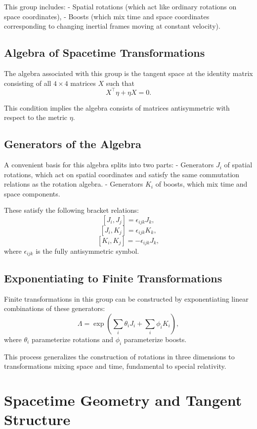 \documentclass{amsart}
\theoremstyle{remark}
\begin{document}
This group includes:
- Spatial rotations (which act like ordinary rotations on space coordinates),
- Boosts (which mix time and space coordinates corresponding to changing inertial frames moving at constant velocity).

\subsection{Algebra of Spacetime Transformations}

The algebra associated with this group is the tangent space at the identity matrix consisting of all \(4 \times 4\) matrices \(X\) such that
\[
X^\top \eta + \eta X = 0.
\]

This condition implies the algebra consists of matrices antisymmetric with respect to the metric \(\eta\).

\subsection{Generators of the Algebra}

A convenient basis for this algebra splits into two parts:
- Generators \(J_i\) of spatial rotations, which act on spatial coordinates and satisfy the same commutation relations as the rotation algebra.
- Generators \(K_i\) of boosts, which mix time and space components.

These satisfy the following bracket relations:
\[
[J_i, J_j] = \epsilon_{ijk} J_k,
\]
\[
[J_i, K_j] = \epsilon_{ijk} K_k,
\]
\[
[K_i, K_j] = -\epsilon_{ijk} J_k,
\]
where \(\epsilon_{ijk}\) is the fully antisymmetric symbol.

\subsection{Exponentiating to Finite Transformations}

Finite transformations in this group can be constructed by exponentiating linear combinations of these generators:
\[
\Lambda = \exp\left(\sum_i \theta_i J_i + \sum_i \phi_i K_i \right),
\]
where \(\theta_i\) parameterize rotations and \(\phi_i\) parameterize boosts.

This process generalizes the construction of rotations in three dimensions to transformations mixing space and time, fundamental to special relativity.

\section{Spacetime Geometry and Tangent Structure}
\label{sec:spacetime_geometry}
\end{document}
